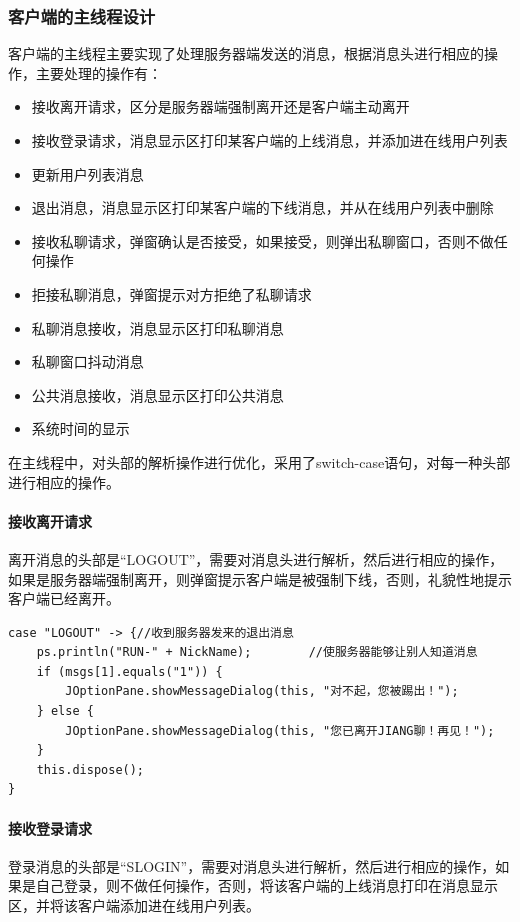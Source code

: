\documentclass[UTF8,12pt]{article}
\begin{document}
\subsubsection{客户端的主线程设计}
客户端的主线程主要实现了处理服务器端发送的消息，根据消息头进行相应的操作，主要处理的操作有：
\begin{itemize}
    \item 接收离开请求，区分是服务器端强制离开还是客户端主动离开
    \item 接收登录请求，消息显示区打印某客户端的上线消息，并添加进在线用户列表
    \item 更新用户列表消息
    \item 退出消息，消息显示区打印某客户端的下线消息，并从在线用户列表中删除
    \item 接收私聊请求，弹窗确认是否接受，如果接受，则弹出私聊窗口，否则不做任何操作
    \item 拒接私聊消息，弹窗提示对方拒绝了私聊请求
    \item 私聊消息接收，消息显示区打印私聊消息
    \item 私聊窗口抖动消息
    \item 公共消息接收，消息显示区打印公共消息
    \item 系统时间的显示
\end{itemize}

在主线程中，对头部的解析操作进行优化，采用了switch-case语句，对每一种头部进行相应的操作。

\paragraph{接收离开请求}
离开消息的头部是“LOGOUT”，需要对消息头进行解析，然后进行相应的操作，如果是服务器端强制离开，则弹窗提示客户端是被强制下线，否则，礼貌性地提示客户端已经离开。

\begin{lstlisting}[title=接收离开请求,frame=shadowbox]
    case "LOGOUT" -> {//收到服务器发来的退出消息
    ps.println("RUN-" + NickName);        //使服务器能够让别人知道消息
    if (msgs[1].equals("1")) {
        JOptionPane.showMessageDialog(this, "对不起，您被踢出！");
    } else {
        JOptionPane.showMessageDialog(this, "您已离开JIANG聊！再见！");
    }
    this.dispose();
}
\end{lstlisting}

\paragraph{接收登录请求}
登录消息的头部是“SLOGIN”，需要对消息头进行解析，然后进行相应的操作，如果是自己登录，则不做任何操作，否则，将该客户端的上线消息打印在消息显示区，并将该客户端添加进在线用户列表。
\end{document}
